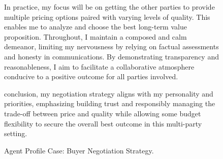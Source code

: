 \begin{figure}[htbp]
\begin{tcolorbox}[colback=blue!2!white, colframe=gray!50!blue]
\begin{minipage}{\linewidth}
In practice, my focus will be on getting the other parties to provide multiple pricing options paired with varying levels of quality. This enables me to analyze and choose the best long-term value proposition. Throughout, I maintain a composed and calm demeanor, limiting my nervousness by relying on factual assessments and honesty in communications. By demonstrating transparency and reasonableness, I aim to facilitate a collaborative atmosphere conducive to a positive outcome for all parties involved.

conclusion, my negotiation strategy aligns with my personality and priorities, emphasizing building trust and responsibly managing the trade-off between price and quality while allowing some budget flexibility to secure the overall best outcome in this multi-party setting.


\end{minipage}
\end{tcolorbox}
\caption{Agent Profile Case: Buyer Negotiation Strategy.}
\label{fig:agent-profile-case-buyer}
\end{figure}

